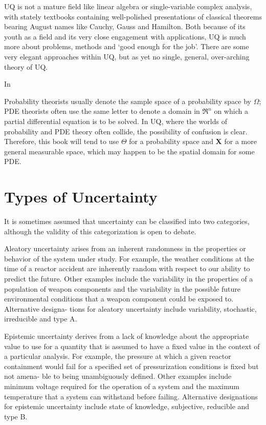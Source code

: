 UQ is not a mature field like linear algebra or single-variable complex analysis, with stately textbooks containing well-polished presentations of classical theorems bearing August names like Cauchy, Gauss and Hamilton. Both because of its youth as a field and its very close engagement with applications, UQ is much more about problems, methods and ‘good enough for the job’. There are some very elegant approaches within UQ, but as yet no single, general, over-arching theory of UQ. %

In %

Probability theorists usually denote the sample space of a probability space by $\Omega$; PDE theorists often use the same letter to denote a domain in $\Re^{n}$ on which a partial differential equation is to be solved. In UQ, where the worlds of probability and PDE theory often collide, the possibility of confusion is clear. Therefore, this book will tend to use $\Theta$ for a probability space and \textbf{X} for a more general measurable space, which may happen to be the spatial domain for some PDE.

\section{Types of Uncertainty}

It is sometimes assumed that uncertainty can be classified into two categories, \cite{Kiureghian2009} although the validity of this categorization is open to debate. 

Aleatory uncertainty arises from an inherent randomness in the properties or behavior of the system under study. For example, the weather conditions at the time of a reactor accident are inherently random with respect to our ability to predict the future. Other examples include the variability in the properties of a population of weapon components and the variability in the possible future environmental conditions that a weapon component could be exposed to. Alternative designa- tions for aleatory uncertainty include variability, stochastic, irreducible and type A. \cite{Helton2009}

Epistemic uncertainty derives from a lack of knowledge about the appropriate value to use for a quantity that is assumed to have a fixed value in the context of a particular analysis. For example, the pressure at which a given reactor containment would fail for a specified set of pressurization conditions is fixed but not amena- ble to being unambiguously defined. Other examples include minimum voltage required for the operation of a system and the maximum temperature that a system can withstand before failing. Alternative designations for epistemic uncertainty include state of knowledge, subjective, reducible and type B. \cite{Helton2009}

